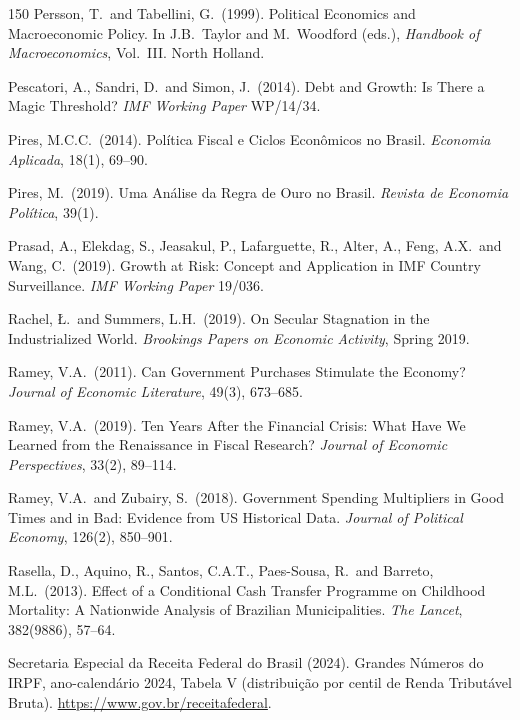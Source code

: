 \documentclass[11pt,a4paper]{article}
\begin{document}
\begin{thebibliography}{150}
 Persson, T.\ and Tabellini, G.\ (1999). Political Economics and Macroeconomic Policy. In J.B.\ Taylor and M.\ Woodford (eds.), \textit{Handbook of Macroeconomics}, Vol.\ III. North Holland.

 Pescatori, A., Sandri, D.\ and Simon, J.\ (2014). Debt and Growth: Is There a Magic Threshold? \textit{IMF Working Paper} WP/14/34.

 Pires, M.C.C.\ (2014). Pol\'itica Fiscal e Ciclos Econ\^omicos no Brasil. \textit{Economia Aplicada}, 18(1), 69--90.

 Pires, M.\ (2019). Uma An\'alise da Regra de Ouro no Brasil. \textit{Revista de Economia Pol\'itica}, 39(1).

 Prasad, A., Elekdag, S., Jeasakul, P., Lafarguette, R., Alter, A., Feng, A.X.\ and Wang, C.\ (2019). Growth at Risk: Concept and Application in IMF Country Surveillance. \textit{IMF Working Paper} 19/036.

 Rachel, {\L}.\ and Summers, L.H.\ (2019). On Secular Stagnation in the Industrialized World. \textit{Brookings Papers on Economic Activity}, Spring 2019.

 Ramey, V.A.\ (2011). Can Government Purchases Stimulate the Economy? \textit{Journal of Economic Literature}, 49(3), 673--685.

 Ramey, V.A.\ (2019). Ten Years After the Financial Crisis: What Have We Learned from the Renaissance in Fiscal Research? \textit{Journal of Economic Perspectives}, 33(2), 89--114.

 Ramey, V.A.\ and Zubairy, S.\ (2018). Government Spending Multipliers in Good Times and in Bad: Evidence from US Historical Data. \textit{Journal of Political Economy}, 126(2), 850--901.

 Rasella, D., Aquino, R., Santos, C.A.T., Paes-Sousa, R.\ and Barreto, M.L.\ (2013). Effect of a Conditional Cash Transfer Programme on Childhood Mortality: A Nationwide Analysis of Brazilian Municipalities. \textit{The Lancet}, 382(9886), 57--64.

 Secretaria Especial da Receita Federal do Brasil (2024). Grandes N\'umeros do IRPF, ano-calend\'ario 2024, Tabela V (distribui\c{c}\~ao por centil de Renda Tribut\'avel Bruta). \url{https://www.gov.br/receitafederal}.


\end{thebibliography}
\end{document}

